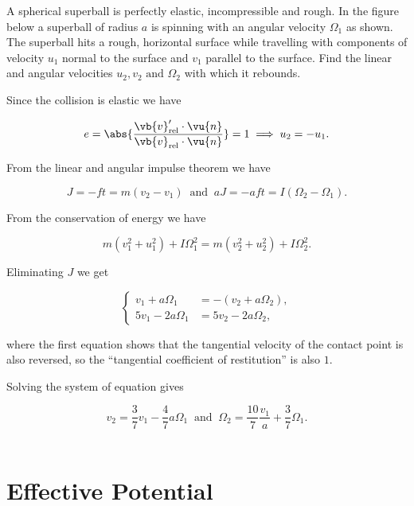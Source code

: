 \documentclass[a4paper,12pt]{report}
\begin{document}
{A spherical superball is perfectly elastic, incompressible and rough. In the figure below a superball of radius \(a\) is spinning with an angular velocity \(\Omega _{1} \) as shown. The superball hits a rough, horizontal surface while travelling with components of velocity \(u_1 \) normal to the surface and \(v_1 \) parallel to the surface. Find the linear and angular velocities \(u_2 , v_2 \text { and } \Omega _{2} \) with which it rebounds.}
{Since the collision is elastic we have 

\begin{equation}
	e = \abs{\frac{\vb{v} _{\text{rel} } ' \cdot \vu{n} }{\vb{v} _{\text{rel} } \cdot \vu{n}  } } = 1 \implies u_2 = -u_1 . 
\end{equation}

From the linear and angular impulse theorem we have 

\begin{equation}
	J = -ft = m(v_2 -v_1 ) ~\text { and }~ aJ = -aft = I(\Omega _{2} - \Omega _{1}  ).
\end{equation}

From the conservation of energy we have 

\begin{equation}
	m(v_1 ^2+u_1 ^2) + I\Omega _{1}^2 = m(v_2 ^2+u_2 ^2) + I\Omega _{2}^2.  
\end{equation}

Eliminating \(J\) we get 

\begin{equation}
	\begin{cases}
		v_1 +a\Omega _{1} &= -(v_2 +a\Omega _{2} ) ,\\
		5v_1 -2a\Omega _{1} &= 5v_2 -2a\Omega _{2}  ,
	\end{cases}
\end{equation}

where the first equation shows that the tangential velocity of the contact point is also reversed, so the ``tangential coefficient of restitution'' is also \(1\).

Solving the system of equation gives 

\begin{equation}
	v_2 =\frac{3}{7} v_1 -\frac{4}{7} a \Omega _{1} ~\text { and }~ \Omega _{2} = \frac{10}{7} \frac{v_1 }{a} + \frac{3}{7} \Omega _{1} .   
\end{equation}
~
} 





\section{Effective Potential}
\end{document}
